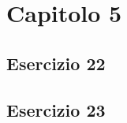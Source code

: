 \section{\textbf{Capitolo 5}}
\subsection{Esercizio 22}

\newpage
\subsection{Esercizio 23}

\newpage
